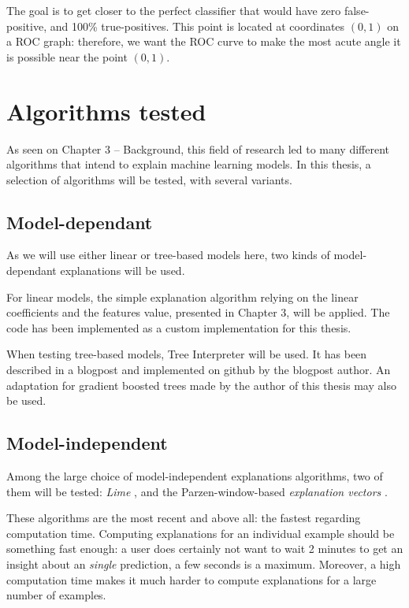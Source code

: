 \documentclass[a4paper,11pt]{kth-mag}
\begin{document}
The goal is to get closer to the perfect classifier that would have zero false-positive, and 100\% true-positives. This point is located at coordinates $(0, 1)$ on a ROC graph: therefore, we want the ROC curve to make the most acute angle it is possible near the point $(0,1)$.

\section{Algorithms tested}

As seen on Chapter 3 -- Background, this field of research led to many different algorithms that intend to explain machine learning models. In this thesis, a selection of algorithms will be tested, with several variants.

\subsection{Model-dependant}

As we will use either linear or tree-based models here, two kinds of model-dependant explanations will be used.

For linear models, the simple explanation algorithm relying on the linear coefficients and the features value, presented in Chapter 3, will be applied. The code has been implemented as a custom implementation for this thesis.

When testing tree-based models, Tree Interpreter will be used. It has been described in a blogpost \cite{treeinterpreter} and implemented on github by the blogpost author. An adaptation for gradient boosted trees made by the author of this thesis may also be used.

\subsection{Model-independent}

Among the large choice of model-independent explanations algorithms, two of them will be tested: \textit{Lime} \cite{lime}, and the Parzen-window-based \textit{explanation vectors} \cite{explvect}.

These algorithms are the most recent and above all: the fastest regarding computation time. Computing explanations for an individual example should be something fast enough: a user does certainly not want to wait 2 minutes to get an insight about an \textit{single} prediction, a few seconds is a maximum. Moreover, a high computation time makes it much harder to compute explanations for a large number of examples.
\end{document}
